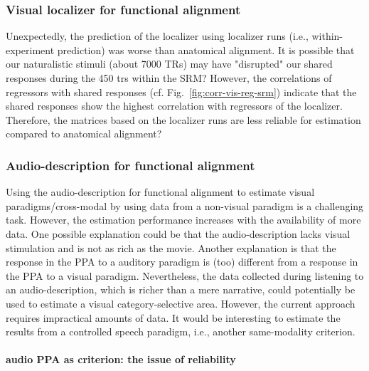 \subsubsection{Visual localizer for functional alignment}



%
Unexpectedly, the prediction of the localizer using localizer runs (i.e.,
within-experiment prediction) was worse than anatomical alignment.
%
It is possible that our naturalistic stimuli (about 7000 TRs) may have
"disrupted" our shared responses during the 450 \acp{tr} within the SRM?
%
However, the correlations of regressors with shared responses (cf.
Fig.~\ref{fig:corr-vis-reg-srm}) indicate that the shared responses show the
highest correlation with regressors of the localizer.
%
Therefore, the matrices based on the localizer runs are less reliable for
estimation compared to anatomical alignment?



\subsubsection{Audio-description for functional alignment}


%
Using the audio-description for functional alignment to estimate visual
paradigms/cross-modal by using data from a non-visual paradigm is a challenging
task.
%
However, the estimation performance increases with the availability of
more data.
%
One possible explanation could be that the audio-description lacks visual
stimulation and is not as rich as the movie.
%
Another explanation is that the response in the PPA to a auditory paradigm is
(too) different from a response in the PPA to a visual paradigm.
%
Nevertheless, the data collected during listening to an audio-description, which
is richer than a mere narrative, could potentially be used to estimate a visual
category-selective area. However, the current approach requires impractical
amounts of data.
%
It would be interesting to estimate the results from a controlled speech
paradigm, i.e., another same-modality criterion.


\paragraph{audio PPA as criterion: the issue of reliability}

